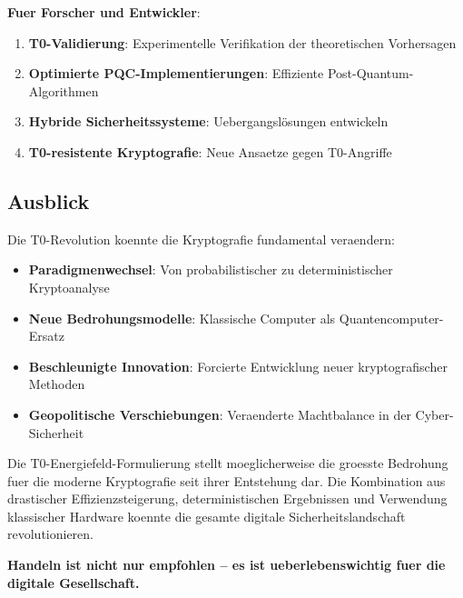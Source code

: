 \documentclass[12pt,a4paper]{article}
\begin{document}
	\textbf{Fuer Forscher und Entwickler}:
	
	\begin{enumerate}
		\item \textbf{T0-Validierung}: Experimentelle Verifikation der theoretischen Vorhersagen
		\item \textbf{Optimierte PQC-Implementierungen}: Effiziente Post-Quantum-Algorithmen
		\item \textbf{Hybride Sicherheitssysteme}: Uebergangslösungen entwickeln
		\item \textbf{T0-resistente Kryptografie}: Neue Ansaetze gegen T0-Angriffe
	\end{enumerate}
	
	\subsection{Ausblick}
	
	Die T0-Revolution koennte die Kryptografie fundamental veraendern:
	
	\begin{itemize}
		\item \textbf{Paradigmenwechsel}: Von probabilistischer zu deterministischer Kryptoanalyse
		\item \textbf{Neue Bedrohungsmodelle}: Klassische Computer als Quantencomputer-Ersatz
		\item \textbf{Beschleunigte Innovation}: Forcierte Entwicklung neuer kryptografischer Methoden
		\item \textbf{Geopolitische Verschiebungen}: Veraenderte Machtbalance in der Cyber-Sicherheit
	\end{itemize}
	
	\begin{tcolorbox}[colback=blue!5!white,colframe=blue!75!black,title=Schlusswort]
		Die T0-Energiefeld-Formulierung stellt moeglicherweise die groesste Bedrohung fuer die moderne Kryptografie seit ihrer Entstehung dar. Die Kombination aus drastischer Effizienzsteigerung, deterministischen Ergebnissen und Verwendung klassischer Hardware koennte die gesamte digitale Sicherheitslandschaft revolutionieren.
		
		\textbf{Handeln ist nicht nur empfohlen -- es ist ueberlebenswichtig fuer die digitale Gesellschaft.}
	\end{tcolorbox}
	
\end{document}
